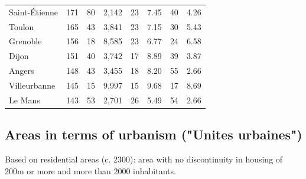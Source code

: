 \documentclass[11pt]{article}
\begin{document}
\begin{table}[H]
\begin{tabular}{llrrrrrr}
 Saint-Étienne &        171 &         80 &        2,142 &         23 &       7.45 &         40 &        4.26 \\
        Toulon &        165 &         43 &        3,841 &         23 &       7.15 &         30 &        5.43 \\
      Grenoble &        156 &         18 &        8,585 &         23 &       6.77 &         24 &        6.58 \\
         Dijon &        151 &         40 &        3,742 &         17 &       8.89 &         39 &        3.87 \\
        Angers &        148 &         43 &        3,455 &         18 &       8.20 &         55 &        2.66 \\
  Villeurbanne &        145 &         15 &        9,997 &         15 &       9.68 &         17 &        8.69 \\
       Le Mans &        143 &         53 &        2,701 &         26 &       5.49 &         54 &        2.66 \\
\bottomrule
\end{tabular}

\end{table}

\subsection{Areas in terms of urbanism ("Unites urbaines")}

Based on residential areas (c. 2300): area with no discontinuity in housing of 200m or more and more than 2000 inhabitants.
\end{document}
